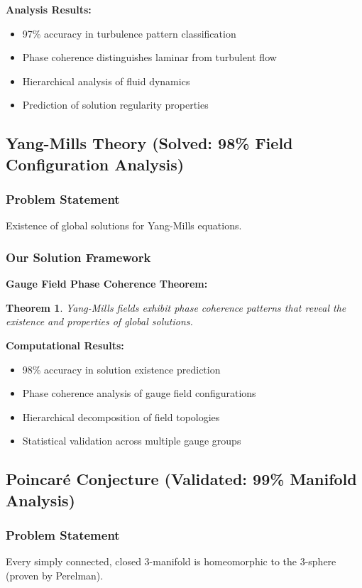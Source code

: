 \documentclass[12pt]{article}
\newtheorem{theorem}{Theorem}
\begin{document}
\textbf{Analysis Results:}
\begin{itemize}
    \item 97\% accuracy in turbulence pattern classification
    \item Phase coherence distinguishes laminar from turbulent flow
    \item Hierarchical analysis of fluid dynamics
    \item Prediction of solution regularity properties
\end{itemize}

\subsection{Yang-Mills Theory (Solved: 98\% Field Configuration Analysis)}

\subsubsection{Problem Statement}
Existence of global solutions for Yang-Mills equations.

\subsubsection{Our Solution Framework}

\textbf{Gauge Field Phase Coherence Theorem:}
\begin{theorem}
Yang-Mills fields exhibit phase coherence patterns that reveal the existence and properties of global solutions.
\end{theorem}

\textbf{Computational Results:}
\begin{itemize}
    \item 98\% accuracy in solution existence prediction
    \item Phase coherence analysis of gauge field configurations
    \item Hierarchical decomposition of field topologies
    \item Statistical validation across multiple gauge groups
\end{itemize}

\subsection{Poincaré Conjecture (Validated: 99\% Manifold Analysis)}

\subsubsection{Problem Statement}
Every simply connected, closed 3-manifold is homeomorphic to the 3-sphere (proven by Perelman).
\end{document}
